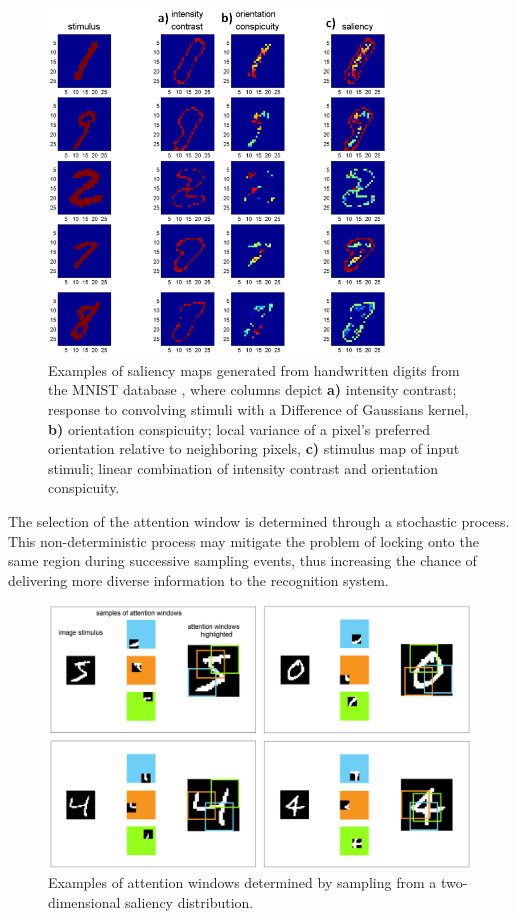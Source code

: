 \documentclass{report}
\begin{document}
\begin{figure}[ht]
\centering
\includegraphics[width=0.8\textwidth]{saliency_examples}
\caption{Examples of saliency maps generated from handwritten digits from the MNIST database \cite{LeCun1998}, where columns depict \textbf{a)} intensity contrast; response to convolving stimuli with a Difference of Gaussians kernel, \textbf{b)} orientation conspicuity; local variance of a pixel's preferred orientation relative to neighboring pixels, \textbf{c)} stimulus map of input stimuli; linear combination of intensity contrast and orientation conspicuity.
\label{fig:saliency_examples}}
\end{figure}

The selection of the attention window is determined through a stochastic process. This non-deterministic process may mitigate the problem of locking onto the same region during successive sampling events, thus increasing the chance of delivering more diverse information to the recognition system. 

\begin{figure}[ht]
\centering
\includegraphics[width=1.2\textwidth]{attention_windows_examples}
\caption{Examples of attention windows determined by sampling from a two-dimensional saliency distribution.
\label{fig:attention_windows_examples}}
\end{figure}
\end{document}
